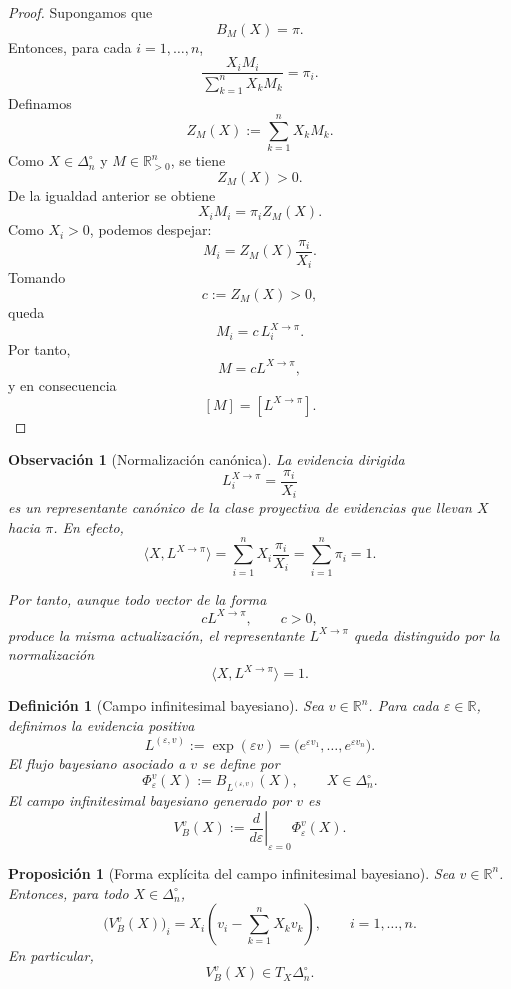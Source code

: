 \documentclass[12pt]{article}
\newtheorem{definicion}{Definición}[section]
\newtheorem{proposicion}{Proposición}[section]
\newtheorem{observacion}{Observación}[section]
\begin{document}
\begin{proof}
Supongamos que
\[
B_M(X)=\pi.
\]
Entonces, para cada \(i=1,\dots,n\),
\[
\frac{X_iM_i}{\sum_{k=1}^{n}X_kM_k}
=
\pi_i.
\]
Definamos
\[
Z_M(X)
:=
\sum_{k=1}^{n}X_kM_k.
\]
Como \(X\in\Delta_n^\circ\) y \(M\in\mathbb{R}_{>0}^{n}\), se tiene
\[
Z_M(X)>0.
\]
De la igualdad anterior se obtiene
\[
X_iM_i
=
\pi_i Z_M(X).
\]
Como \(X_i>0\), podemos despejar:
\[
M_i
=
Z_M(X)\frac{\pi_i}{X_i}.
\]
Tomando
\[
c:=Z_M(X)>0,
\]
queda
\[
M_i
=
c\,L_i^{X\to \pi}.
\]
Por tanto,
\[
M=cL^{X\to \pi},
\]
y en consecuencia
\[
[M]=[L^{X\to \pi}].
\]
\end{proof}

\begin{observacion}[Normalización canónica]
La evidencia dirigida
\[
L_i^{X\to \pi}
=
\frac{\pi_i}{X_i}
\]
es un representante canónico de la clase proyectiva de evidencias que llevan \(X\) hacia
\(\pi\). En efecto,
\[
\langle X,L^{X\to \pi}\rangle
=
\sum_{i=1}^{n}X_i\frac{\pi_i}{X_i}
=
\sum_{i=1}^{n}\pi_i
=
1.
\]

Por tanto, aunque todo vector de la forma
\[
cL^{X\to \pi},
\qquad c>0,
\]
produce la misma actualización, el representante \(L^{X\to \pi}\) queda distinguido por la
normalización
\[
\langle X,L^{X\to \pi}\rangle=1.
\]
\end{observacion}

\begin{definicion}[Campo infinitesimal bayesiano]
Sea \(v\in\mathbb{R}^{n}\). Para cada \(\varepsilon\in\mathbb{R}\), definimos la evidencia
positiva
\[
L^{(\varepsilon,v)}
:=
\exp(\varepsilon v)
=
\bigl(
e^{\varepsilon v_1},\dots,e^{\varepsilon v_n}
\bigr).
\]
El flujo bayesiano asociado a \(v\) se define por
\[
\Phi_\varepsilon^v(X)
:=
B_{L^{(\varepsilon,v)}}(X),
\qquad X\in\Delta_n^\circ.
\]
El \emph{campo infinitesimal bayesiano} generado por \(v\) es
\[
V_B^v(X)
:=
\left.\frac{d}{d\varepsilon}\right|_{\varepsilon=0}
\Phi_\varepsilon^v(X).
\]
\end{definicion}

\begin{proposicion}[Forma explícita del campo infinitesimal bayesiano]
Sea \(v\in\mathbb{R}^{n}\). Entonces, para todo \(X\in\Delta_n^\circ\),
\[
\bigl(V_B^v(X)\bigr)_i
=
X_i\left(v_i-\sum_{k=1}^{n}X_kv_k\right),
\qquad i=1,\dots,n.
\]
En particular,
\[
V_B^v(X)\in T_X\Delta_n^\circ.
\]
\end{proposicion}
\end{document}
